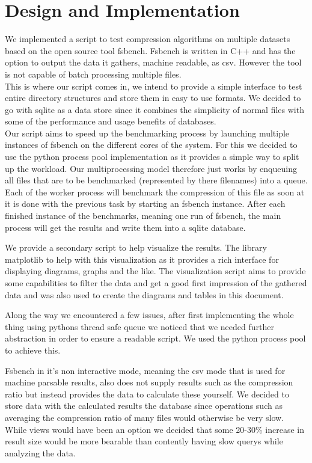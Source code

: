 \documentclass[
	12pt,
	a4paper,
	BCOR10mm,
	DIV14,
	listof=totoc,
	bibliography=totoc,
	headsepline
]{scrreprt}
\begin{document}
\chapter{Design and Implementation}
\label{Design}
We implemented a script to test compression algorithms on multiple datasets based on the open source tool fsbench. 
Fsbench is written in C++ and has the option to output the data it gathers, machine readable, as csv.
However the tool is not capable of batch processing multiple files. \\
This is where our script comes in, we intend to provide a simple interface to test entire directory structures and store them in easy to use formats.
We decided to go with sqlite as a data store since it combines the simplicity of normal files with some of the performance and usage benefits of databases. \\
Our script aims to speed up the benchmarking process by launching multiple instances of fsbench on the different cores of the system.
For this we decided to use the python process pool implementation as it provides a simple way to split up the workload.
Our multiprocessing model therefore just works by enqueuing all files that are to be benchmarked (represented by there filenames) into a queue.
Each of the worker process will benchmark the compression of this file as soon at it is done with the previous task by starting an fsbench instance.
After each finished instance of the benchmarks, meaning one run of fsbench, the main process will get the results and write them into a sqlite database.

We provide a secondary script to help visualize the results. 
The library matplotlib to help with this visualization as it provides a rich interface for displaying diagrams, graphs and the like.
The visualization script aims to provide some capabilities to filter the data and get a good first impression of the gathered data and was also used to create the diagrams and tables in this document.


Along the way we encountered a few issues, after first implementing the whole thing using pythons thread safe queue we noticed that we needed further abstraction in order to ensure a readable script. We used the python process pool to achieve this.

Fsbench in it's non interactive mode, meaning the csv mode that is used for machine parsable results, also does not supply results such as the compression ratio but instead provides the data to calculate these yourself. We decided to store data with the calculated results the database since operations such as averaging the compression ratio of many files would otherwise be very slow.
While views would have been an option we decided that some 20-30\% increase in result size would be more bearable than contently having slow querys while analyzing the data.
\end{document}
